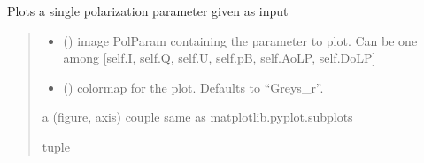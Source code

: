 \documentclass[letterpaper,10pt,english]{sphinxmanual}
\begin{document}
\begin{fulllineitems}
\begin{fulllineitems}
\label{\detokenize{micropolarray:micropolarray.micropol_image.MicropolImage.show_pol_param}}
\pysigstartsignatures
{}
\pysigstopsignatures
\sphinxAtStartPar
Plots a single polarization parameter given as input
\begin{quote}\begin{description}
\begin{itemize}
\item {} 
\sphinxAtStartPar
{} ({\hyperref[\detokenize{micropolarray:micropolarray.micropol_image.PolParam}]{}}) \textendash{} image PolParam containing the parameter to plot. Can be one among {[}self.I, self.Q, self.U, self.pB, self.AoLP, self.DoLP{]}

\item {} 
\sphinxAtStartPar
{} (\sphinxstyleliteralemphasis{\sphinxupquote{, }}) \textendash{} colormap for the plot. Defaults to “Greys\_r”.

\end{itemize}

\sphinxAtStartPar
a (figure, axis) couple same as matplotlib.pyplot.subplots

\sphinxAtStartPar
tuple

\end{description}\end{quote}

\end{fulllineitems}



\end{fulllineitems}
\end{document}
